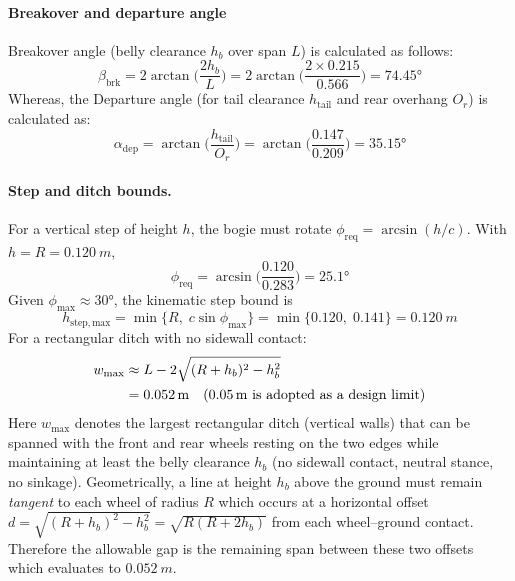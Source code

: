 \documentclass[letterpaper, 10 pt, conference]{ieeeconf}  %
\begin{document}
\paragraph*{Breakover and departure angle}
Breakover angle (belly clearance \(h_b\) over span \(L\)) is calculated as follows:
\begin{equation}
\beta_{\mathrm{brk}}=2\arctan\!\Big(\frac{2h_b}{L}\Big)
=2\arctan\!\Big(\frac{2\times 0.215}{0.566}\Big)=\ang{74.45}
\end{equation}
Whereas, the Departure angle (for tail clearance \(h_{\mathrm{tail}}\) and rear overhang \(O_r\)) is calculated as:
\begin{equation}
\alpha_{\mathrm{dep}}=\arctan\!\Big(\frac{h_{\mathrm{tail}}}{O_r}\Big)
=\arctan\!\Big(\frac{0.147}{0.209}\Big)=\ang{35.15}
\end{equation}

\paragraph*{Step and ditch bounds.}
For a vertical step of height \(h\), the bogie must rotate \(\phi_{\mathrm{req}}=\arcsin(h/c)\). 
With \(h=R=\SI{0.120}{m}\),
\begin{equation}
\phi_{\mathrm{req}}=\arcsin\!\Big(\frac{0.120}{0.283}\Big)=\ang{25.1}
\end{equation}
Given \(\phi_{\max}\approx \ang{30}\), the kinematic step bound is
\begin{equation}
h_{\mathrm{step,max}}=\min\{R,\;c\sin\phi_{\max}\}=\min\{0.120,\;0.141\}=\SI{0.120}{m}
\end{equation}
For a rectangular ditch with no sidewall contact:
\begin{equation}
\begin{aligned}
w_{\max} &\approx L - 2\sqrt{(R+h_b)^2 - h_b^2}\\
         &= \SI{0.052}{\meter}\quad\text{(\SI{0.05}{m} is adopted as a design limit)}
\end{aligned}
\end{equation}
Here $w_{\max}$ denotes the largest rectangular ditch (vertical walls) that can be
spanned with the front and rear wheels resting on the two edges while maintaining at
least the belly clearance $h_b$ (no sidewall contact, neutral stance, no sinkage).
Geometrically, a line at height $h_b$ above the ground must remain \emph{tangent} to
each wheel of radius $R$ which occurs at a horizontal offset
$d=\sqrt{(R+h_b)^2-h_b^2}=\sqrt{R(R+2h_b)}$ from each wheel–ground contact.
Therefore the allowable gap is the remaining span between these two offsets which evaluates to $\SI{0.052}{m}$.
\end{document}
